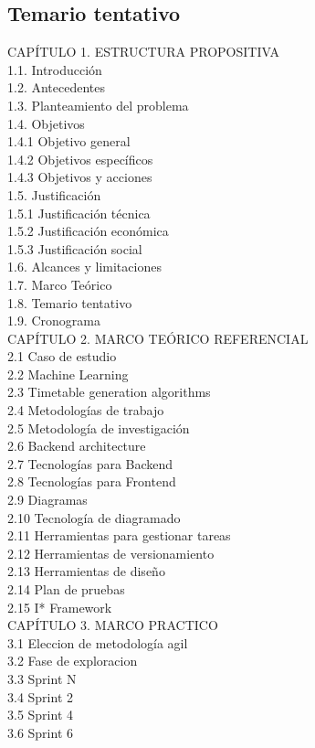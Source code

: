 \subsection{Temario tentativo}

CAPÍTULO 1. ESTRUCTURA PROPOSITIVA \\
1.1. Introducción \\
1.2. Antecedentes \\
1.3. Planteamiento del problema \\
1.4. Objetivos \\
1.4.1 Objetivo general\\
1.4.2 Objetivos específicos \\
1.4.3 Objetivos y acciones \\
1.5. Justificación \\
1.5.1 Justificación técnica \\
1.5.2 Justificación económica \\
1.5.3 Justificación social \\
1.6. Alcances y limitaciones \\
1.7. Marco Teórico \\
1.8. Temario tentativo \\
1.9. Cronograma \\

CAPÍTULO 2. MARCO TEÓRICO REFERENCIAL \\
2.1 Caso de estudio\\
2.2 Machine Learning\\
2.3 Timetable generation algorithms\\
2.4 Metodologías de trabajo\\
2.5 Metodología de investigación\\
2.6 Backend architecture\\
2.7 Tecnologías para Backend\\
2.8 Tecnologías para Frontend\\
2.9 Diagramas\\
2.10 Tecnología de diagramado\\
2.11 Herramientas para gestionar tareas\\
2.12 Herramientas de versionamiento\\
2.13 Herramientas de diseño\\
2.14 Plan de pruebas\\
2.15 I* Framework\\

CAPÍTULO 3. MARCO PRACTICO \\

3.1 Eleccion de metodología agil \\
3.2 Fase de exploracion \\
3.3 Sprint N \\
3.4 Sprint 2 \\
3.5 Sprint 4 \\
3.6 Sprint 6 \\

